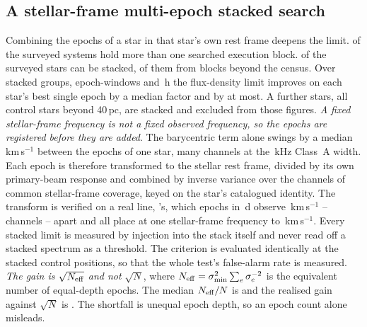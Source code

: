 \subsection{A stellar-frame multi-epoch stacked search}
\label{sec:stack}

Combining the epochs of a star in that star's own rest frame deepens the
limit. \EpMulti{} of the \NSystems{} surveyed systems hold more than one
searched execution block. \SxStkStarCensus{} of the surveyed stars can be
stacked, \SttNStkOneEb{} of them from blocks beyond the census. Over
\SyStkNGroup{} stacked groups, \SyStkNEpochComb{} epoch-windows and
\SyStkHours\,h the flux-density limit improves on each star's best single epoch
by a median factor \SyStkGainMed{} and by \SyStkGainMax{} at most. A further
\SxStkStarOutside{} stars, all control stars beyond 40\,pc, are stacked and
excluded from those figures. \emph{A fixed stellar-frame frequency is not a
fixed observed frequency, so the epochs are registered before they are added}.
The barycentric term alone swings by a median \StkVcorrSwingMed\,km\,s$^{-1}$
between the epochs of one star, many channels at the \StkRefChanKHz\,kHz
Class~A width. Each epoch is therefore transformed to the stellar rest frame,
divided by its own primary-beam response and combined by inverse variance over
the channels of common stellar-frame coverage, keyed on the star's catalogued
identity. The transform is verified on a real line, \StkPersistLineStar's,
which \StkRegNEpoch{} epochs in \StkRegSpanD\,d observe
\StkRegTopoKms\,km\,s$^{-1}$ -- \StkRegTopoChan{} channels -- apart and all
place at one stellar-frame frequency to \FrEpochStelKms\,km\,s$^{-1}$. Every stacked limit is
measured by injection into the stack itself and never read off a stacked
spectrum as a threshold. The criterion is evaluated identically at the stacked
control positions, so that the whole test's false-alarm rate is measured.
\emph{The gain is $\sqrt{N_{\rm eff}}$ and not
$\sqrt{N}$}, where $N_{\rm eff}=\sigma_{\min}^{2}\sum_e\sigma_e^{-2}$ is the
equivalent number of equal-depth epochs. The median $N_{\rm eff}/N$ is
\StkNeffFrac{} and the realised gain against $\sqrt{N}$ is \StkGainVsN. The
shortfall is unequal epoch depth, so an epoch count alone misleads.

